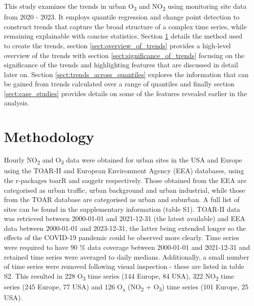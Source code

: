 \documentclass[journal abbreviation, manuscript]{copernicus}
\begin{document}
This study examines the trends in urban O\textsubscript{3} and NO\textsubscript{2} using monitoring site data from 2020 - 2023. It employs quantile regression and change point detection to construct trends that capture the broad structure of a complex time series, while remaining explainable with concise statistics. Section \ref{sect:method} details the method used to create the trends, section \ref{sect:overview_of_trends} provides a high-level overview of the trends with section \ref{sect:significance_of_trends} focusing on the significance of the trends and highlighting features that are discussed in detail later on. Section \ref{sect:trends_across_quantiles} explores the information that can be gained from trends calculated over a range of quantiles and finally section \ref{sect:case_studies} provides details on some of the features revealed earlier in the analysis. 

\section{Methodology} \label{sect:method}
Hourly NO\textsubscript{2} and O\textsubscript{3} data were obtained for urban sites in the USA and Europe using the TOAR-II \citep{toar_db} and European Environment Agency (EEA) \citep{eea_1, eea_2} databases, using the r-packages toarR \citep{drysdale_2024_14537446} and saqgetr \citep{saqgetr} respectively. Those obtained from the EEA are categorised as urban traffic, urban background and urban industrial, while those from the TOAR database are categorised as urban and suburban. A full list of sites can be found in the supplementary information (table S1).  TOAR-II data was retrieved between 2000-01-01 and 2021-12-31 (the latest available) and EEA data between 2000-01-01 and 2023-12-31, the latter being extended longer so the effects of the COVID-19 pandemic could be observed more clearly. Time series were required to have 90 \% data coverage between 2000-01-01 and 2021-12-31 and retained time series were averaged to daily medians. Additionally, a small number of time series were removed following visual inspection - these are listed in table S2. This resulted in 228 O\textsubscript{3} time series (144 Europe, 84 USA), 322 NO\textsubscript{2} time series (245 Europe, 77 USA) and 126 O\textsubscript{x} (NO\textsubscript{2} + O\textsubscript{3}) time series (101 Europe, 25 USA).
\end{document}
